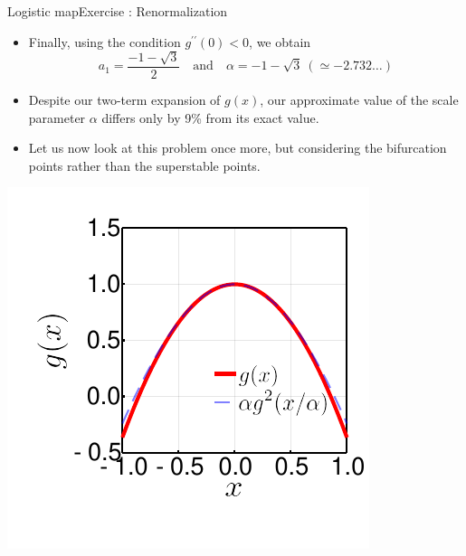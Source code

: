 \documentclass[usenames,dvipsnames,svgnames,10pt,aspectratio=169]{beamer}
\begin{document}
\begin{frame}[t, c]{Logistic map}{Exercise : Renormalization}
	\begin{minipage}{.68\textwidth}
		\begin{itemize}
			\item Finally, using the condition \(g^{\prime \prime}(0) < 0\), we obtain
			\[
				a_1 = \frac{-1 - \sqrt{3}}{2} \quad \text{and} \quad \alpha = -1 - \sqrt{3} \ (\simeq -2.732\ldots)
			\]

			\item Despite our two-term expansion of \(g(x)\), our approximate value of the scale parameter \( \alpha \) differs only by 9\% from its exact value.

			\bigskip

			\item Let us now look at this problem once more, but considering the bifurcation points rather than the superstable points.
		\end{itemize}
	\end{minipage}%
	\hfill
	\begin{minipage}{.28\textwidth}
		\centering
		\includegraphics[width=\textwidth]{quadratic_functional_equation}
	\end{minipage}

	\vspace{1cm}
\end{frame}
\end{document}
